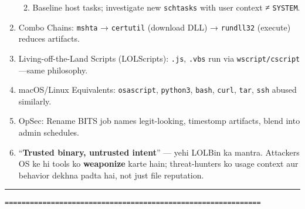 \documentclass[a4paper,12pt]{article}
\begin{document}
\begin{enumerate}[leftmargin=*,itemsep=0.5em]
\begin{enumerate}
\begin{tcolorbox}[colback=codebg, boxrule=0.5pt, arc=4pt, boxsep=5pt]
        \end{tcolorbox}
      \item Baseline host tasks; investigate new \texttt{schtasks} with user context ≠ \texttt{SYSTEM}.
    \end{enumerate}
  \item Combo Chains: \texttt{mshta} → \texttt{certutil} (download DLL) → \texttt{rundll32} (execute) reduces artifacts.
  \item Living-off-the-Land Scripts (LOLScripts): \texttt{.js}, \texttt{.vbs} run via \texttt{wscript/cscript}—same philosophy.
  \item macOS/Linux Equivalents: \texttt{osascript}, \texttt{python3}, \texttt{bash}, \texttt{curl}, \texttt{tar}, \texttt{ssh} abused similarly.
  \item OpSec: Rename BITS job names legit-looking, timestomp artifacts, blend into admin schedules.
  \item “\textbf{Trusted binary, untrusted intent}” — yehi LOLBin ka mantra. Attackers OS ke hi tools ko \textbf{weaponize} karte hain; threat-hunters ko usage context aur behavior dekhna padta hai, not just file reputation.

\end{enumerate}

\vspace{1em}
\noindent\rule{\textwidth}{1pt}
\texttt{=============================================================}

\end{document}
